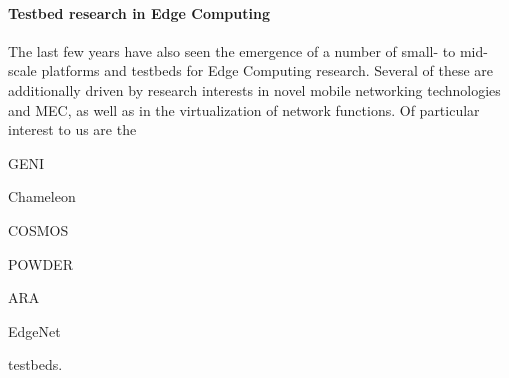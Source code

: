 \paragraph{Testbed research in Edge Computing} The last few years have also seen the emergence of a number of small- to mid-scale platforms and testbeds for Edge Computing research.
Several of these are additionally driven by research interests in novel mobile networking technologies and \gls{MEC}, as well as in the virtualization of network functions.
Of particular interest to us are the
\begin{inlineenum}
    \item \acs{GENI}
    \item Chameleon
    \item \acs{COSMOS}
    \item \acs{POWDER}
    \item \acs{ARA}
    \item EdgeNet
\end{inlineenum} testbeds.

